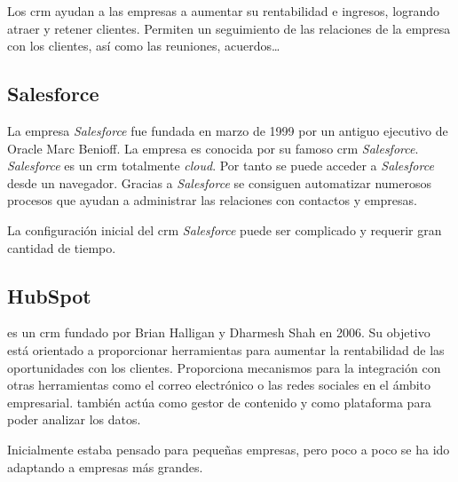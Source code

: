 Los \acrshort{crm} ayudan a las empresas a aumentar su rentabilidad e ingresos, logrando atraer y retener clientes. 
Permiten un seguimiento de las relaciones de la empresa con los clientes, así como las reuniones, acuerdos\ldots


\subsection{Salesforce}
La empresa \textit{Salesforce} fue fundada en marzo de 1999 por un antiguo ejecutivo de Oracle Marc Benioff. La empresa es conocida por su famoso \acrshort{crm}
\textit{Salesforce}. \textit{Salesforce} es un \acrshort{crm} totalmente \textit{cloud}. Por tanto se puede acceder a \textit{Salesforce} desde un navegador. Gracias a \textit{Salesforce} se consiguen automatizar numerosos procesos que ayudan a administrar las relaciones con contactos y empresas.

La configuración inicial del \acrshort{crm} \textit{Salesforce} puede ser complicado y requerir gran cantidad de tiempo.


\subsection{HubSpot}

\hs{} es un \acrshort{crm} fundado por Brian Halligan y Dharmesh Shah en 2006. Su objetivo está orientado a proporcionar herramientas para aumentar la rentabilidad de las oportunidades con los clientes. Proporciona mecanismos para la integración con otras herramientas como el correo electrónico o las redes sociales en el ámbito empresarial. \hs{} también actúa como gestor de contenido y como plataforma para poder analizar los datos.

Inicialmente estaba pensado para pequeñas empresas, pero poco a poco se ha ido adaptando a empresas más grandes.
